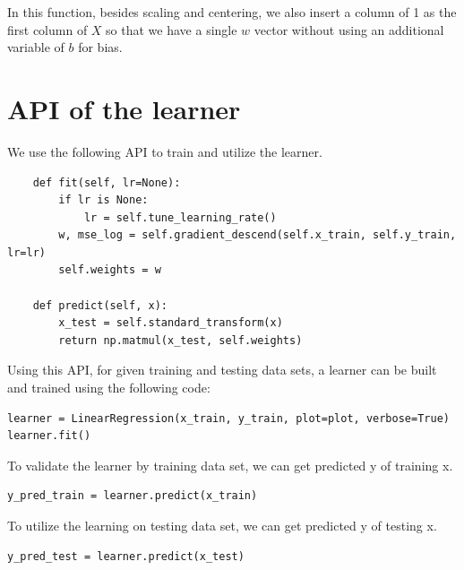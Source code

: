 \documentclass[
	letterpaper
]{article}
\begin{document}
In this function, besides scaling and centering, we also insert a column of 1 as the first column of $X$ so that we have a single $w$ vector without using an additional variable of $b$ for bias.

\section{API of the learner}
We use the following API to train and utilize the learner.
\begin{lstlisting}
    def fit(self, lr=None):
        if lr is None:
            lr = self.tune_learning_rate()
        w, mse_log = self.gradient_descend(self.x_train, self.y_train, lr=lr)
        self.weights = w
    
    def predict(self, x):
        x_test = self.standard_transform(x)
        return np.matmul(x_test, self.weights)
\end{lstlisting}

Using this API, for given training and testing data sets, a learner can be built and trained using the following code:
\begin{lstlisting}
learner = LinearRegression(x_train, y_train, plot=plot, verbose=True)
learner.fit()
\end{lstlisting}
To validate the learner by training data set, we can get predicted y of training x.
\begin{lstlisting}
y_pred_train = learner.predict(x_train)
\end{lstlisting}
To utilize the learning on testing data set, we can get predicted y of testing x.
\begin{lstlisting}
y_pred_test = learner.predict(x_test)
\end{lstlisting}
\end{document}
